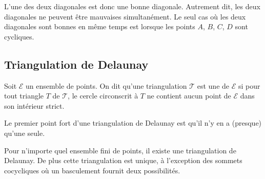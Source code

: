 \documentclass[11pt,class=report,crop=false]{standalone}
\begin{document}
L'une des deux diagonales est donc une bonne diagonale.
Autrement dit, les deux diagonales ne peuvent être mauvaises simultanément.
Le seul cas où les deux diagonales sont bonnes en même temps est lorsque les points $A$, $B$, $C$, $D$ sont cycliques.



\subsection{Triangulation de Delaunay}

\begin{definition}
	Soit $\mathcal{E}$ un ensemble de points.
	On dit qu'une triangulation $\mathcal{T}$ est une  de $\mathcal{E}$
	si pour tout triangle $T$ de $\mathcal{T}$, le cercle circonscrit à $T$ ne contient aucun point de $\mathcal{E}$ dans son intérieur strict.
\end{definition}	

Le premier point fort d'une triangulation de Delaunay est qu'il n'y en a (presque) qu'une seule.
\begin{theoreme}
Pour n'importe quel ensemble fini de points, il existe une triangulation de Delaunay.
De plus cette triangulation est unique, à l'exception des sommets cocycliques où un basculement fournit deux possibilités.
\end{theoreme}

\end{document}

